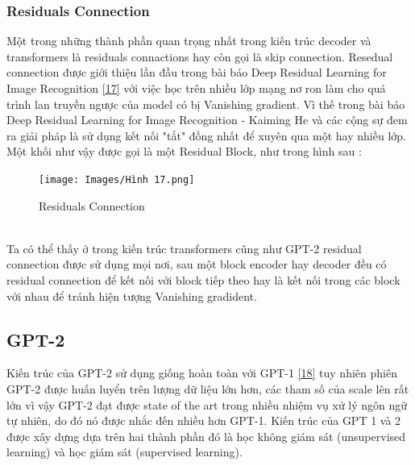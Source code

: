 \documentclass[a4paper]{article}
\theoremstyle{definition}
\begin{document}
\subsubsection{Residuals Connection}
Một trong những thành phần quan trọng nhất trong kiến trúc decoder và transformers là residuals connactions hay còn gọi là skip connection. Resedual connection được giới thiệu lần đầu trong bài báo Deep Residual Learning for Image Recognition \href{Deep Residual Learning for Image Recognition}{[17]} với việc học trên nhiều lớp mạng nơ ron làm cho quá trình lan truyền ngược của model có bị Vanishing gradient. Vì thế trong bài báo Deep Residual Learning for Image Recognition - Kaiming He và các cộng sự đem ra giải pháp là sử dụng kết nối "tắt" đồng nhất để xuyên qua một hay nhiều lớp. Một khối như vậy được gọi là một Residual Block, như trong hình sau :\\
\begin{figure}[h!]
\begin{center}
\texttt{[image: Images/Hình 17.png]} \\[0.25in]

\caption{Residuals Connection}
\end{center}
\end{figure}
\\
Ta có thể thấy ở trong kiến trúc transformers cũng như GPT-2 residual connection được sử dụng mọi nơi, sau một block encoder hay decoder đều có residual connection để kết nối với block tiếp theo hay là kết nối trong các block với nhau để tránh hiện tượng Vanishing gradident. 



 
\newpage
\subsection{GPT-2}
Kiến trúc của GPT-2 sử dụng giống hoàn toàn với GPT-1 \href{https://s3-us-west-2.amazonaws.com/openai-assets/research-covers/language-unsupervised/language_understanding_paper.pdf}{[18]} tuy nhiên phiên GPT-2 được huấn luyển trên lượng dữ liệu lớn hơn, các tham số của scale lên rất lớn vì vậy GPT-2 đạt được state of the art trong nhiều nhiệm vụ xử lý ngôn ngữ tự nhiên, do đó nó được nhắc đến nhiều hơn GPT-1. Kiến trúc của GPT 1 và 2 được xây dựng dựa trên hai thành phần đó là học không giám sát (unsupervised learning) và học giám sát (supervised learning). 
\end{document}
